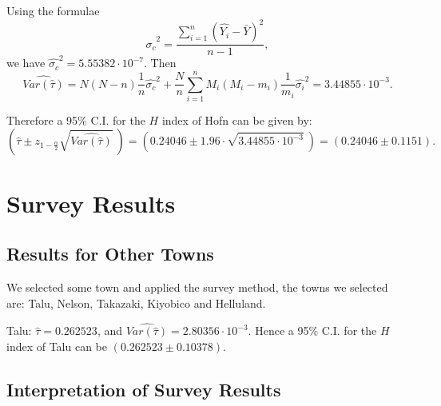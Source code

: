 \documentclass[12pt]{article}%
\begin{document}
Using the formulae 
$$\hat{\sigma_c}^2=\frac{ \sum_{i=1}^n (\hat{Y_i} - \bar{Y})^2 }{n-1},$$
we have $\hat{\sigma_c}^2 = 5.55382\cdot 10^{-7}.$ Then 
$$\widehat{Var(\hat{\tau})} 
= N(N-n)\frac{1}{n}\hat{\sigma_c}^2
+\frac{N}{n}\sum_{i=1}^{n}M_i(M_i-m_i)\frac{1}{m_i}\hat{\sigma_i}^2
=3.44855\cdot 10^{-3}.$$

Therefore a 95\% C.I. for the $H$ index of Hofn can be given by: 
$$(\hat{\tau} \pm z_{1-\frac{\alpha}{2}}\sqrt{\widehat{Var(\hat{\tau})}}~)
=(0.24046 \pm 1.96\cdot \sqrt{3.44855\cdot 10^{-3}}~)
=(0.24046 \pm 0.1151).$$

\section{Survey Results}
\subsection{Results for Other Towns}
We selected some town and applied the survey method, 
the towns we selected are: Talu, Nelson, Takazaki, Kiyobico and Helluland.

Talu: $\hat{\tau}=0.262523$, and $\widehat{Var(\hat{\tau})}=2.80356\cdot 10^{-3}.$ 
Hence a 95\% C.I. for the $H$ index of Talu can be $(0.262523 \pm 0.10378)$.



\subsection{Interpretation of Survey Results}
\end{document}

